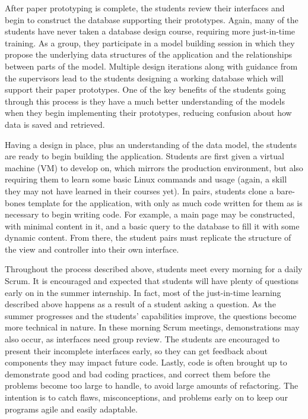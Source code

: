 After paper prototyping is complete, the students review their interfaces and begin to construct the database supporting their prototypes. Again, many of the students have never taken a database design course, requiring more just-in-time training. As a group, they participate in a model building session in which they propose the underlying data structures of the application and the relationships between parts of the model. Multiple design iterations along with guidance from the supervisors lead to the students designing a working database which will support their paper prototypes. One of the key benefits of the students going through this process is they have a much better understanding of the models when they begin implementing their prototypes, reducing confusion about how data is saved and retrieved.

Having a design in place, plus an understanding of the data model, the students are ready to begin building the application. Students are first given a virtual machine (VM) to develop on, which mirrors the production environment, but also requiring them to learn some basic Linux commands and usage (again, a skill they may not have learned in their courses yet). In pairs, students clone a bare-bones template for the application, with only as much code written for them as is necessary to begin writing code. For example, a main page may be constructed, with minimal content in it, and a basic query to the database to fill it with some dynamic content. From there, the student pairs must replicate the structure of the view and controller into their own interface.

Throughout the process described above, students meet every morning for a daily Scrum. It is encouraged and expected that students will have plenty of questions early on in the summer internship. In fact, most of the just-in-time learning described above happens as a result of a student asking a question. As the summer progresses and the students' capabilities improve, the questions become more technical in nature. In these morning Scrum meetings, demonstrations may also occur, as interfaces need group review. The students are encouraged to present their incomplete interfaces early, so they can get feedback about components they may impact future code. Lastly, code is often brought up to demonstrate good and bad coding practices, and correct them before the problems become too large to handle, to avoid large amounts of refactoring. The intention is to catch flaws, misconceptions, and problems early on to keep our programs agile and easily adaptable.

